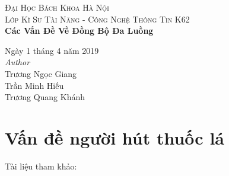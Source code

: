 \documentclass[a4paper]{article}
\begin{document}
\textsc{\LARGE Đại Học Bách Khoa Hà Nội} \\[1,5cm]
	\textsc{\large Lớp Kĩ Sư Tài Năng - Công Nghệ Thông Tin K62} \\[0.5cm]
	{\huge\bfseries Các Vấn Đề Về Đồng Bộ Đa Luồng}\\[0.4cm] 
	
		\begin{flushleft}
			\large
			Ngày 1 tháng 4 năm 2019 \\[0.5cm]
			\textit{Author}\\[0,3cm]
			   Trương Ngọc Giang \\
			   Trần Minh Hiếu  \\
			   Trương Quang Khánh \\
		\end{flushleft}
		
	\tableofcontents
	
	\section{Vấn đề người hút thuốc lá}
	Tài liệu tham khảo: \cite{littlebook4} \\
\end{document}
